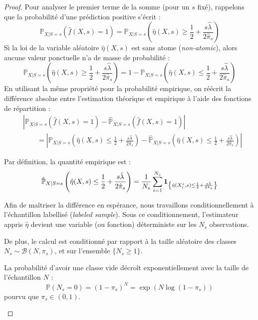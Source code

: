 \begin{proof}
    Pour analyser le premier terme de la somme (pour un $s$ fixé), rappelons que la probabilité d'une prédiction positive s'écrit :
    \begin{equation}
        \mathbb{P}_{X|S=s}(\hat{f}(X, s) = 1) = \mathbb{P}_{X|S=s}\left( \hat{\eta}(X, s) \ge \frac{1}{2} + \frac{s\hat{\lambda}}{2\hat{\pi}_s} \right)
    \end{equation}
    Si la loi de la variable aléatoire $\hat{\eta}(X, s)$ est sans atome (\textit{non-atomic}), alors aucune valeur ponctuelle n'a de masse de probabilité :
    \begin{equation}
        \mathbb{P}_{X|S=s}\left( \hat{\eta}(X, s) \ge \frac{1}{2} + \frac{s\hat{\lambda}}{2\hat{\pi}_s} \right) = 1 - \mathbb{P}_{X|S=s}\left( \hat{\eta}(X, s) \le \frac{1}{2} + \frac{s\hat{\lambda}}{2\hat{\pi}_s} \right)
    \end{equation}
    En utilisant la même propriété pour la probabilité empirique, on réécrit la différence absolue entre l'estimation théorique et empirique à l'aide des fonctions de répartition :
    \begin{align}
        &\left| \mathbb{P}_{X|S=s}(\hat{f}(X, s)=1) - \hat{\mathbb{P}}_{X|S=s}(\hat{f}(X, s)=1) \right| \nonumber \\
        &\qquad = \left| \mathbb{P}_{X|S=s} \left( \hat{\eta}(X, s) \le \frac{1}{2} + \frac{s\hat{\lambda}}{2\hat{\pi}_s} \right) - \hat{\mathbb{P}}_{X|S=s} \left( \hat{\eta}(X, s) \le \frac{1}{2} + \frac{s\hat{\lambda}}{2\hat{\pi}_s} \right) \right|
    \end{align}
    
    Par définition, la quantité empirique est :
    \begin{equation}
        \hat{\mathbb{P}}_{X|S=s} \left( \hat{\eta}(X, s) \le \frac{1}{2} + \frac{s\hat{\lambda}}{2\hat{\pi}_s} \right) = \frac{1}{N_s} \sum_{i=1}^{N_s} \mathbf{1}_{\left\{ \hat{\eta}(X_i^s, s) \le \frac{1}{2} + \frac{s\hat{\lambda}}{2\hat{\pi}_s} \right\}}
    \end{equation}
    
    Afin de maîtriser la différence en espérance, nous travaillons conditionnellement à l'échantillon labellisé (\textit{labeled sample}).
    Sous ce conditionnement, l'estimateur appris $\hat{\eta}$ devient une variable (ou fonction) déterministe sur les $N_s$ observations.
    
    De plus, le calcul est conditionné par rapport à la taille aléatoire des classes $N_s \sim \mathcal{B}(N, \pi_s)$, et sur l'ensemble $\{N_s \ge 1\}$.
    \begin{remarque}
        La probabilité d'avoir une classe vide décroît exponentiellement avec la taille de l'échantillon $N$ :
        \begin{equation*}
            \mathbb{P}(N_s = 0) = (1 - \pi_s)^N = \exp(N \log(1 - \pi_s))
        \end{equation*}
        pourvu que $\pi_s \in (0, 1)$.
    \end{remarque}
    

\end{proof}
